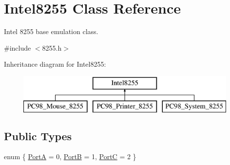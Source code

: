 \hypertarget{classIntel8255}{\section{Intel8255 Class Reference}
\label{classIntel8255}
}


Intel 8255 base emulation class.  




{\ttfamily \#include $<$8255.\-h$>$}

Inheritance diagram for Intel8255\-:\begin{figure}[H]
\begin{center}
\leavevmode
\includegraphics[height=2.000000cm]{classIntel8255}
\end{center}
\end{figure}
\subsection*{Public Types}
\begin{DoxyCompactItemize}
\item 
enum \{ \hyperlink{classIntel8255_afad1dcdd07864ccadd09c33e1af473eda37629392c4361095a45143d6093e0a71}{Port\-A} = 0, 
\hyperlink{classIntel8255_afad1dcdd07864ccadd09c33e1af473eda480265dca14f2d4b03d6d0f6e9ae66f3}{Port\-B} = 1, 
\hyperlink{classIntel8255_afad1dcdd07864ccadd09c33e1af473edac42dfe5b4e1996f66b828cb26b79fb95}{Port\-C} = 2
 \}
\end{DoxyCompactItemize}
